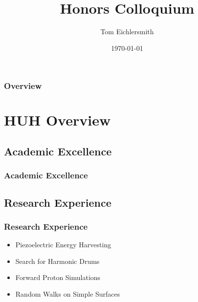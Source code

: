 \documentclass{beamer}
\title[HUH Colloquium]{Honors Colloquium} %
\author{Tom Eichlersmith}
\institute[Hamline U]
{
Hamline University \\
\medskip
\textit{teichlersmith01@hamline.edu}
}
\date{\today}
\begin{document}
\begin{frame}
\titlepage %
\end{frame}

\begin{frame}
\frametitle{Overview} %
\tableofcontents %
\end{frame}


\section{HUH Overview} 

\subsection{Academic Excellence} %

\begin{frame}
\frametitle{Academic Excellence}

\end{frame}


\subsection{Research Experience}

\begin{frame}
\frametitle{Research Experience}

\begin{itemize}
	\item Piezoelectric Energy Harvesting
	\item Search for Harmonic Drums
	\item Forward Proton Simulations
	\item Random Walks on Simple Surfaces
\end{itemize}

\end{frame}
\end{document}
